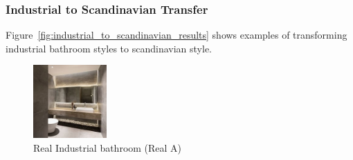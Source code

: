 \documentclass[twocolumn,superscriptaddress,aps]{revtex4-1}
\begin{document}
\subsubsection{Industrial to Scandinavian Transfer}

Figure~\ref{fig:industrial_to_scandinavian_results} shows examples of transforming industrial bathroom styles to scandinavian style.

\begin{figure}[h]
\centering
\includegraphics[width=0.25\textwidth]{assets/real_A.png}
\caption{Real Industrial bathroom (Real A)}
\label{fig:real_industrial}
\end{figure}
\end{document}
